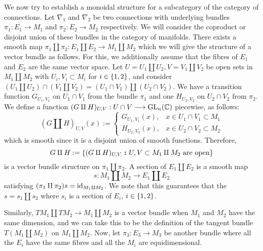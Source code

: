 \documentclass[./Thick_TQFTs_and_Quantum_Information.tex]{subfiles}
\begin{document}
We now try to establish a monoidal structure for a subcategory of the category
of connections. Let $\nabla_1$ and $\nabla_2$ be two connections with underlying
bundles $\pi_1 : E_1 \to M_1$ and $\pi_2 : E_2 \to M_2$ respectively. We will
consider the coproduct or disjoint union of these bundles in the category of
manifolds. There exists a smooth map
$\pi_1 \amalg \pi_2 : E_1 \amalg E_2 \to M_1 \amalg M_2$ which we will give the
structure of a vector bundle as follows. For this, we additionally assume that
the fibres of $E_1$ and $E_2$ are the same vector space. Let
$U = U_1 \amalg U_2, V = V_1 \amalg V_2$ be open sets in $M_1 \amalg M_2$ with
$U_i, V_i \subset M_i$ for $i \in \set{1, 2}$, and consider
$(U_1 \amalg U_2) \cap (V_1 \amalg V_2) = (U_1 \cap V_1) \amalg (U_2 \cap V_2)$.
We have a transition function $G_{U_1, V_1}$ on $U_1 \cap V_1$ from the bundle
$\pi_1$ and one $H_{U_2, V_2}$ on $U_2 \cap V_2$ from $\pi_2$. We define a
function $(G \amalg H)_{U, V} : U \cap V \stackrel{}{\longrightarrow} \text{GL}_n(\mathbb{C})$ piecewise, as
follows:
\[
  (G \amalg H)_{U, V}(x) := \begin{cases}
    G_{U_1, V_1}(x), & x \in U_1 \cap V_1 \subset M_1 \\
    H_{U_2, V_2}(x), & x \in U_2 \cap V_2 \subset M_2
  \end{cases}
\]
which is smooth since it is a disjoint union of smooth functions. Therefore,
\[
  G \amalg H := \set[(G \amalg H)_{U, V}]
                    {U, V \subset M_1 \amalg M_2 \text{ are open}}
\]
is a vector bundle structure on $\pi_1 \amalg \pi_2$. A section of
$E_1 \amalg E_2$ is a smooth map
\[
  s : M_1 \amalg M_2 \to E_1 \amalg E_2
\]
satisfying $(\pi_1 \amalg \pi_2)s = \text{id}_{M_1 \amalg M_2}$. We note that this
guarantees that the $s = s_1 \amalg s_2$ where $s_i$ is a section of
$E_i$, $i \in \set{1, 2}$.

Similarly, $TM_1 \amalg TM_2 \to M_1 \amalg M_2$ is a vector bundle when $M_1$
and $M_2$ have the same dimension, and we can take this to be the definition of
the tangent bundle $T(M_1 \amalg M_2)$ on $M_1 \amalg M_2$. Now, let
$\pi_3 : E_3 \to M_3$ be another bundle where all the $E_i$ have the same fibres
and all the $M_i$ are equidimensional.
\end{document}
